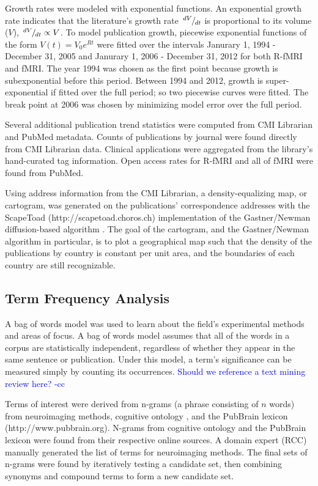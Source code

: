 \documentclass[5p]{elsarticle}
\def\slantfrac#1#2{\kern.1em^{#1}\kern-.1em/\kern-.1em_{#2}}
\begin{document}
Growth rates were modeled with exponential functions. An exponential growth rate
indicates that the literature’s growth rate $\slantfrac{dV}{dt}$ is proportional
to its volume ($V$), $\slantfrac{dV}{dt} \propto V$.  To model publication
growth, piecewise exponential functions of the form $V(t)=V_0 e^{Rt}$ were
fitted over the intervals Janurary 1, 1994 - December 31, 2005 and 
Janurary 1, 2006 - December 31, 2012 for
both R-fMRI and fMRI. The year 1994 was chosen as the first point because growth
is subexponential before this period. Between 1994 and 2012, growth is
super-exponential if fitted over the full period; so two piecewise curves were
fitted. The break point at 2006 was chosen by minimizing model error over the
full period. 

Several additional publication trend statistics were computed from CMI Librarian
and PubMed metadata. Counts of publications by journal were found directly from
CMI Librarian data. Clinical applications were aggregated from the library’s
hand-curated tag information. Open access rates for R-fMRI and all of
fMRI were found from PubMed. 

Using address information from the CMI Librarian, a density-equalizing map, or
cartogram, was generated on the publications’ correspondence addresses with the
ScapeToad (http://scapetoad.choros.ch) implementation of the Gastner/Newman
diffusion-based algorithm \cite{Gastner2004}.  The goal of the cartogram, and
the Gastner/Newman algorithm in particular, is to plot a geographical map such
that the density of the publications by country is constant per unit area, and
the boundaries of each country are still recognizable.

\subsection{Term Frequency Analysis}
A bag of words model was used to learn about the field’s experimental methods
and areas of focus. A bag of words model assumes that all of the words in a
corpus are statistically independent, regardless of whether they appear in the
same sentence or publication.  Under this model, a term’s significance can be
measured simply by counting its occurrences. \textcolor{blue}{Should we reference
a text mining review here? -cc}

Terms of interest were derived from n-grams (a phrase consisting of $n$ words)
from neuroimaging methods, cognitive ontology \cite{Poldrack2011}, and the
PubBrain lexicon (http://www.pubbrain.org). N-grams from cognitive ontology and
the PubBrain lexicon were found from their respective online sources. A domain
expert (RCC) manually generated the list of terms for neuroimaging methods. The
final sets of n-grams were found by iteratively testing a candidate set, then
combining synonyms and compound terms to form a new candidate set.
\end{document}
